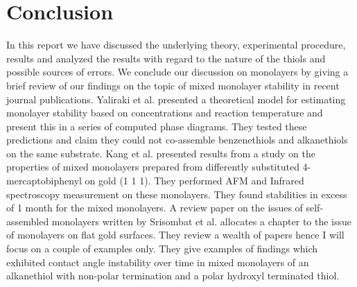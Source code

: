 \section{Conclusion}

In this report we have discussed the underlying theory, experimental procedure, results and analyzed the results with regard to the nature of the thiols and possible sources of errors.
We conclude our discussion on monolayers by giving a brief review of our findings on the topic of mixed monolayer stability in recent journal publications.
Yaliraki et al. presented a theoretical model for estimating monolayer stability based on concentrations and reaction temperature and present this in a series of computed phase diagrams. They tested these predictions and claim they could not co-assemble benzenethiols and alkanethiols on the same substrate. \cite{yaliraki}
Kang et al. presented results from a study on the properties of mixed monolayers prepared from differently substituted 4-mercaptobiphenyl on gold (1 1 1). They performed AFM and Infrared spectroscopy measurement on these monolayers. They found stabilities in excess of 1 month for the mixed monolayers. \cite{kang}
A review paper on the issues of self-assembled monolayers written by Srisombat et al. allocates a chapter to the issue of monolayers on flat gold surfaces. They review a wealth of papers hence I will focus on a couple of examples only. They give examples of findings which exhibited contact angle instability over time in mixed monolayers of an alkanethiol with non-polar termination and a polar hydroxyl terminated thiol. \cite{srisombat}
